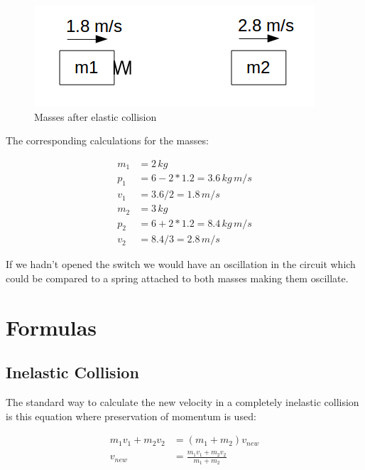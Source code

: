 \documentclass[]{elementary-physics}
\begin{document}
\begin{figure}[ht] \centering
	\includegraphics[scale=.5]{mms3} \caption{Masses after elastic collision}
\end{figure}

The corresponding calculations for the masses:

\begin{subequations}
\begin{align}
m_1 &= 2 \, kg \\
p_1 &= 6 - 2*1.2 = 3.6 \, kg \, m/s \\
v_1 &= 3.6 / 2 = 1.8 \, m/s \\
m_2 &= 3 \, kg \\
p_2 &= 6 + 2*1.2 = 8.4 \, kg \, m/s \\
v_2 &= 8.4 / 3 = 2.8 \, m/s 
\end{align}
\end{subequations}

If we hadn't opened the switch we would have an oscillation in the circuit which could be compared to a spring attached to both masses making them oscillate.

\section{Formulas}

\subsection{Inelastic Collision}

The standard way to calculate the new velocity in a completely inelastic collision is this equation where preservation of momentum is used:

\begin{subequations}
\begin{align}
m_1 v_1 + m_2 v_2 &= (m_1 + m_2)v_{new} \\
v_{new} &= \frac{m_1 v_1 + m_2 v_2}{m_1 + m_2}
\end{align}
\end{subequations}
\end{document}
